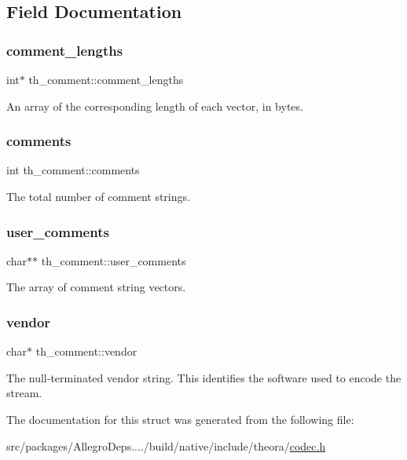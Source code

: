 \subsection{Field Documentation}
\mbox{\label{structth__comment_a723dc6fdf75757e70e28eea864b10898}} 
\subsubsection{\texorpdfstring{comment\+\_\+lengths}{comment\_lengths}}
{\footnotesize\ttfamily int$\ast$ th\+\_\+comment\+::comment\+\_\+lengths}

An array of the corresponding length of each vector, in bytes. \mbox{\label{structth__comment_a5990c34932376f070ad0fc314daaeb78}} 
\subsubsection{\texorpdfstring{comments}{comments}}
{\footnotesize\ttfamily int th\+\_\+comment\+::comments}

The total number of comment strings. \mbox{\label{structth__comment_ad72830e183e707bb0df423eb73b00de4}} 
\subsubsection{\texorpdfstring{user\+\_\+comments}{user\_comments}}
{\footnotesize\ttfamily char$\ast$$\ast$ th\+\_\+comment\+::user\+\_\+comments}

The array of comment string vectors. \mbox{\label{structth__comment_a93fbe894d23603f56843be15b0cbdba0}} 
\subsubsection{\texorpdfstring{vendor}{vendor}}
{\footnotesize\ttfamily char$\ast$ th\+\_\+comment\+::vendor}

The null-\/terminated vendor string. This identifies the software used to encode the stream. 

The documentation for this struct was generated from the following file\+:\begin{DoxyCompactItemize}
\item 
src/packages/\+Allegro\+Deps..../build/native/include/theora/\hyperlink{theora_2codec_8h}{codec.\+h}\end{DoxyCompactItemize}
